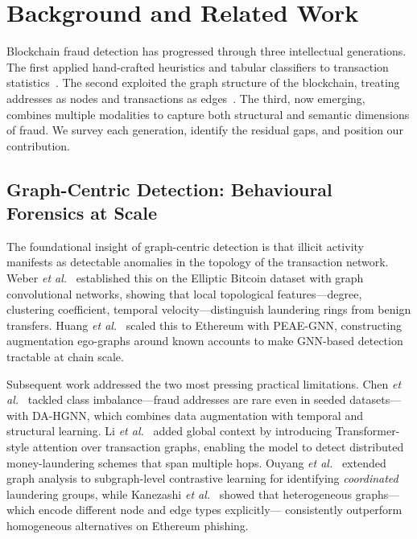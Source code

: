 \section{Background and Related Work}
\label{sec:background}

Blockchain fraud detection has progressed through three intellectual
generations.  The first applied hand-crafted heuristics and tabular
classifiers to transaction statistics~\cite{ostapowicz2019,blanco2022,
ashfaq2022,elmougy2023}.  The second exploited the graph structure of
the blockchain, treating addresses as nodes and transactions as
edges~\cite{kim2023,zhou2021,ctgcn2024}.  The third, now emerging,
combines multiple modalities to capture both structural and semantic
dimensions of fraud.  We survey each generation, identify the residual
gaps, and position our contribution.

\subsection{Graph-Centric Detection: Behavioural Forensics at Scale}

The foundational insight of graph-centric detection is that illicit
activity manifests as detectable anomalies in the topology of the
transaction network.  Weber \emph{et al.}~\cite{weber2019} established
this on the Elliptic Bitcoin dataset with graph convolutional networks,
showing that local topological features---degree, clustering
coefficient, temporal velocity---distinguish laundering rings from
benign transfers.  Huang \emph{et al.}~\cite{huang2024peae} scaled this
to Ethereum with PEAE-GNN, constructing augmentation ego-graphs around
known accounts to make GNN-based detection tractable at chain
scale.

Subsequent work addressed the two most pressing practical
limitations.  Chen \emph{et al.}~\cite{chen2024dahgnn} tackled class
imbalance---fraud addresses are rare even in seeded datasets---with
DA-HGNN, which combines data augmentation with temporal and structural
learning.  Li \emph{et al.}~\cite{li2025global,li2022ttagn} added
global context by introducing Transformer-style attention over transaction
graphs, enabling the model to detect distributed money-laundering schemes
that span multiple hops.  Ouyang \emph{et al.}~\cite{ouyang2024bitchetg}
extended graph analysis to subgraph-level contrastive learning for
identifying \emph{coordinated} laundering groups, while Kanezashi
\emph{et al.}~\cite{kanezashi2022hetero} showed that heterogeneous
graphs---which encode different node and edge types explicitly---
consistently outperform homogeneous alternatives on Ethereum phishing.

